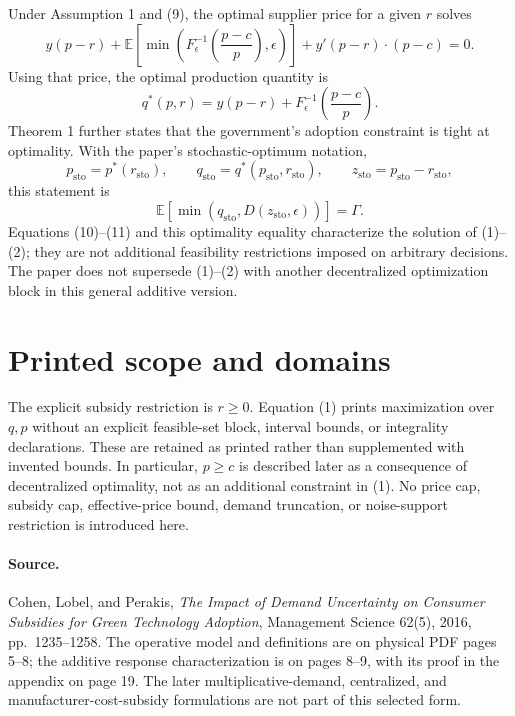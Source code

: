 \documentclass{article}
\begin{document}
Under Assumption 1 and (9), the optimal supplier price for a given $r$ solves
\begin{equation}
y(p-r)
+\mathbb{E}\left[\min\left(F_\epsilon^{-1}\!\left(\frac{p-c}{p}\right),\epsilon\right)\right]
+y'(p-r)\cdot(p-c)=0.
\tag{10}
\end{equation}
Using that price, the optimal production quantity is
\begin{equation}
q^*(p,r)=y(p-r)+F_\epsilon^{-1}\!\left(\frac{p-c}{p}\right).
\tag{11}
\end{equation}
Theorem 1 further states that the government's adoption constraint is tight at optimality. With the paper's stochastic-optimum notation,
\[
p_{\mathrm{sto}}=p^*(r_{\mathrm{sto}}),
\qquad
q_{\mathrm{sto}}=q^*(p_{\mathrm{sto}},r_{\mathrm{sto}}),
\qquad
z_{\mathrm{sto}}=p_{\mathrm{sto}}-r_{\mathrm{sto}},
\]
this statement is
\[
\mathbb{E}\left[\min(q_{\mathrm{sto}},D(z_{\mathrm{sto}},\epsilon))\right]=\Gamma.
\]
Equations (10)--(11) and this optimality equality characterize the solution of (1)--(2); they are not additional feasibility restrictions imposed on arbitrary decisions. The paper does not supersede (1)--(2) with another decentralized optimization block in this general additive version.

\section*{Printed scope and domains}
The explicit subsidy restriction is $r\geq0$. Equation (1) prints maximization over $q,p$ without an explicit feasible-set block, interval bounds, or integrality declarations. These are retained as printed rather than supplemented with invented bounds. In particular, $p\geq c$ is described later as a consequence of decentralized optimality, not as an additional constraint in (1). No price cap, subsidy cap, effective-price bound, demand truncation, or noise-support restriction is introduced here.

\paragraph{Source.}
Cohen, Lobel, and Perakis, \emph{The Impact of Demand Uncertainty on Consumer Subsidies for Green Technology Adoption}, Management Science 62(5), 2016, pp.~1235--1258. The operative model and definitions are on physical PDF pages 5--8; the additive response characterization is on pages 8--9, with its proof in the appendix on page 19. The later multiplicative-demand, centralized, and manufacturer-cost-subsidy formulations are not part of this selected form.
\end{document}
